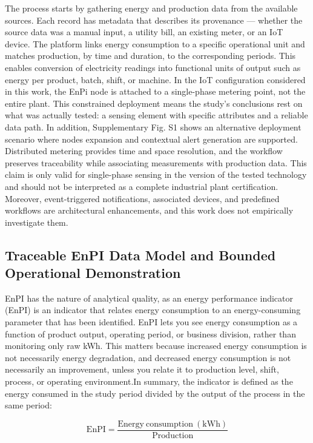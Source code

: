 \documentclass[technologies,article,submit,pdftex,moreauthors]{Definitions/mdpi}
\begin{document}
The process starts by gathering energy and production data from the available sources. Each record has metadata that describes its provenance — whether the source data was a manual input, a utility bill, an existing meter, or an IoT device. The platform links energy consumption to a specific operational unit and matches production, by time and duration, to the corresponding periods. This enables conversion of electricity readings into functional units of output such as energy per product, batch, shift, or machine.
In the IoT configuration considered in this work, the EnPi node is attached to a single-phase metering point, not the entire plant. This constrained deployment means the study's conclusions rest on what was actually tested: a sensing element with specific attributes and a reliable data path.
In addition, Supplementary Fig. S1 shows an alternative deployment scenario where nodes expansion and contextual alert generation are supported. Distributed metering provides time and space resolution, and the workflow preserves traceability while associating measurements with production data. This claim is only valid for single-phase sensing in the version of the tested technology and should not be interpreted as a complete industrial plant certification. Moreover, event-triggered notifications, associated devices, and predefined workflows are architectural enhancements, and this work does not empirically investigate them. 

\subsection{Traceable EnPI Data Model and Bounded Operational Demonstration}
\label{sec:enpi-data-model}
EnPI has the nature of analytical quality, as an energy performance indicator (EnPI) is an indicator that relates energy consumption to an energy-consuming parameter that has been identified. EnPI lets you see energy consumption as a function of product output, operating period, or business division, rather than monitoring only raw kWh. This matters because increased energy consumption is not necessarily energy degradation, and decreased energy consumption is not necessarily an improvement, unless you relate it to production level, shift, process, or operating environment.In summary, the indicator is defined as the energy consumed in the study period divided by the output of the process in the same period: 

\begin{equation}
\mathrm{EnPI}=\frac{\mathrm{Energy\ consumption\ (kWh)}}{\mathrm{Production}}
\label{eq:enpi}
\end{equation}
\end{document}
